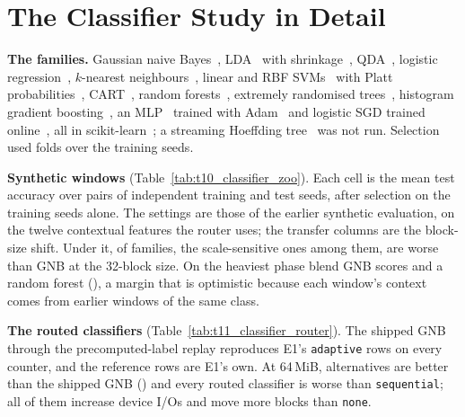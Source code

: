 

\section{The Classifier Study in Detail}\label{app:classifiers}

\textbf{The families.} Gaussian naive
Bayes~\cite{domingos1997optimality,zhang2004optimality}, LDA~\cite{fisher1936use}
with shrinkage~\cite{ledoit2004well}, QDA~\cite{hastie2009elements}, logistic
regression~\cite{cox1958regression}, $k$-nearest
neighbours~\cite{cover1967nearest}, linear and RBF
SVMs~\cite{cortes1995support} with Platt
probabilities~\cite{platt1999probabilistic}, CART~\cite{breiman1984cart},
random forests~\cite{breiman2001random}, extremely randomised
trees~\cite{geurts2006extremely}, histogram gradient
boosting~\cite{friedman2001greedy,ke2017lightgbm}, an
MLP~\cite{rumelhart1986learning} trained with Adam~\cite{kingma2015adam} and
logistic SGD trained online~\cite{bottou2010large}, all in
scikit-learn~\cite{pedregosa2011sklearn}; a streaming Hoeffding
tree~\cite{domingos2000mining} was not run. Selection used
\clfSynFolds{} folds over the training seeds.

\textbf{Synthetic windows} (Table~\ref{tab:t10_classifier_zoo}). Each cell is
the mean test accuracy over \clfSynSeedPairs{} pairs of independent training
and test seeds, after selection on the training seeds alone. The settings are
those of the earlier synthetic evaluation, on the twelve contextual features
the router uses; the transfer columns are the block-size shift. Under it,
\decTallyClfZeroTransferOneToThirtyTwoWorse{} of
\decTallyClfZeroTransferOneToThirtyTwo{} families, the scale-sensitive ones
among them, are worse than GNB at the 32-block size. On the heaviest phase blend GNB
scores \clfSynAccTransitionHeavyGnbOnline{} and a random forest
\clfSynAccTransitionHeavyRf{} (\clfSynDeltaTransitionHeavyRfCI), a margin that
is optimistic because each window's context comes from earlier windows of the
same class.



\textbf{The routed classifiers} (Table~\ref{tab:t11_classifier_router}). The
shipped GNB through the precomputed-label replay reproduces E1's
\texttt{adaptive} rows on every counter, and the reference rows are E1's own.
At 64\,MiB, \decTallyClfTwoSixtyFourMiBBetter{} alternatives are better than the
shipped GNB (\decClfClaimTunedBetterSixtyFourMiBVerdict) and every routed
classifier is worse than \texttt{sequential}; all of them increase device I/Os
and move more blocks than \texttt{none}.

